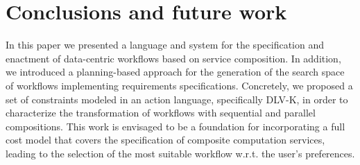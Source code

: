 
\section{Conclusions and future work} \label{sec:conclusions}

In this paper we presented a language and system for the specification and enactment of data-centric workflows based on service composition. In addition, we introduced a planning-based approach for the generation of the search space of workflows implementing requirements specifications. Concretely, we proposed a set of constraints modeled in an action language, specifically DLV-K, in order to characterize the transformation of workflows with sequential and parallel compositions. This work is envisaged to be a foundation for incorporating a full cost model that covers the specification of composite computation services, leading to the selection of the most suitable workflow w.r.t. the user's preferences.
